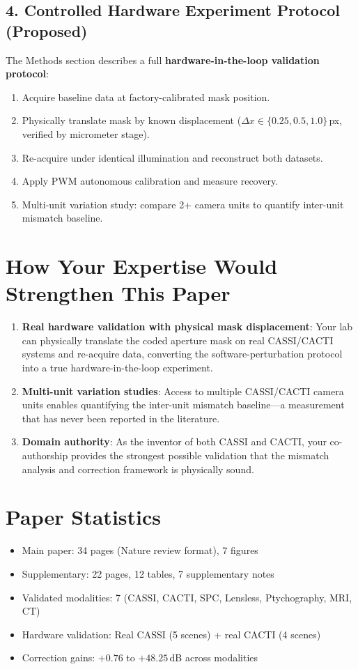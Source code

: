 \documentclass[11pt]{article}
\begin{document}
\subsection*{4. Controlled Hardware Experiment Protocol (Proposed)}

The Methods section describes a full \textbf{hardware-in-the-loop validation protocol}:
\begin{enumerate}
  \item Acquire baseline data at factory-calibrated mask position.
  \item Physically translate mask by known displacement ($\Delta x \in \{0.25, 0.5, 1.0\}$\,px, verified by micrometer stage).
  \item Re-acquire under identical illumination and reconstruct both datasets.
  \item Apply PWM autonomous calibration and measure recovery.
  \item Multi-unit variation study: compare 2+ camera units to quantify inter-unit mismatch baseline.
\end{enumerate}

\section*{How Your Expertise Would Strengthen This Paper}

\begin{enumerate}
  \item \textbf{Real hardware validation with physical mask displacement}: Your lab can physically translate the coded aperture mask on real CASSI/CACTI systems and re-acquire data, converting the software-perturbation protocol into a true hardware-in-the-loop experiment.
  \item \textbf{Multi-unit variation studies}: Access to multiple CASSI/CACTI camera units enables quantifying the inter-unit mismatch baseline---a measurement that has never been reported in the literature.
  \item \textbf{Domain authority}: As the inventor of both CASSI and CACTI, your co-authorship provides the strongest possible validation that the mismatch analysis and correction framework is physically sound.
\end{enumerate}

\section*{Paper Statistics}
\begin{itemize}
  \item Main paper: 34 pages (Nature review format), 7 figures
  \item Supplementary: 22 pages, 12 tables, 7 supplementary notes
  \item Validated modalities: 7 (CASSI, CACTI, SPC, Lensless, Ptychography, MRI, CT)
  \item Hardware validation: Real CASSI (5 scenes) + real CACTI (4 scenes)
  \item Correction gains: $+0.76$ to $+48.25$\,dB across modalities
\end{itemize}
\end{document}
